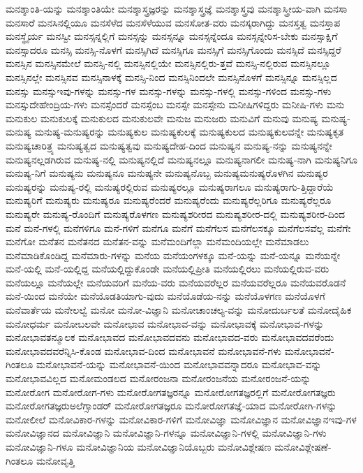 {ಮನಶ್ಶಾಂತಿ-ಯನ್ನು
ಮನಶ್ಶಾಂತಿಯೇ
ಮನಶ್ಶಾಸ್ತ್ರಜ್ಞರನ್ನು
ಮನಶ್ಶಾಸ್ತ್ರಜ್ಞೆ
ಮನಶ್ಶಾಸ್ತ್ರವು
ಮನಶ್ಶಾಸ್ತ್ರೀಯ-ವಾಗಿ
ಮನಸಾ
ಮನಸಾರೆ
ಮನಸಿನಲ್ಲಿಯೂ
ಮನಸೆಳೆದ
ಮನಸೆಳೆಯುವ
ಮನಸೋತ-ವರು
ಮನಸ್ಕರಾಗಿದ್ದು
ಮನಸ್ತತ್ವ
ಮನಸ್ತಾಪ
ಮನಸ್ಥೈರ್ಯ
ಮನಸ್ವೀ
ಮನಸ್ಸನ್ನಲ್ಲಿಗೆ
ಮನಸ್ಸನ್ನು
ಮನಸ್ಸನ್ನೂ
ಮನಸ್ಸನ್ನೆಂದೂ
ಮನಸ್ಸನ್ನೇರಿಸ-ಬೇಕು
ಮನಸ್ಸಾಕ್ಷಿಗೆ
ಮನಸ್ಸಾದರೂ
ಮನಸ್ಸಿ
ಮನಸ್ಸಿ-ನೊಳಗೆ
ಮನಸ್ಸಿಗಿದೆ
ಮನಸ್ಸಿಗೂ
ಮನಸ್ಸಿಗೆ
ಮನಸ್ಸಿಗೊಂದು
ಮನಸ್ಸಿದೆ
ಮನಸ್ಸಿದ್ದರೆ
ಮನಸ್ಸಿನ
ಮನಸ್ಸಿನಮೇಲೆ
ಮನಸ್ಸಿ-ನಲ್ಲಿ
ಮನಸ್ಸಿನಲ್ಲಿಯೇ
ಮನಸ್ಸಿನಲ್ಲಿರು-ತ್ತವೆ
ಮನಸ್ಸಿ-ನಲ್ಲಿರುವ
ಮನಸ್ಸಿನಲ್ಲೂ
ಮನಸ್ಸಿನಲ್ಲೇ
ಮನಸ್ಸಿನವ
ಮನಸ್ಸಿನಾಳಕ್ಕೆ
ಮನಸ್ಸಿ-ನಿಂದ
ಮನಸ್ಸಿನಿಂದಲೇ
ಮನಸ್ಸಿನೊಳಗೆ
ಮನಸ್ಸಿನ್ನೂ
ಮನಸ್ಸಿಲ್ಲದ
ಮನಸ್ಸು
ಮನಸ್ಸುಇವು-ಗಳನ್ನು
ಮನಸ್ಸು-ಗಳ
ಮನಸ್ಸು-ಗಳನ್ನು
ಮನಸ್ಸು-ಗಳಲ್ಲಿ
ಮನಸ್ಸು-ಗಳಿಂದ
ಮನಸ್ಸು-ಗಳು
ಮನಸ್ಸುದೇಹೇಂದ್ರಿಯ-ಗಳು
ಮನಸ್ಸೆಂದರೆ
ಮನಸ್ಸೆಂಬ
ಮನಸ್ಸೇ
ಮನಸ್ಸೇನು
ಮನೀಷಿಗಳಿದ್ದರು
ಮನೀಷಿ-ಗಳು
ಮನು
ಮನುಕುಲ
ಮನುಕುಲಕ್ಕೆ
ಮನುಕುಲದ
ಮನುಕುಲವೇ
ಮನುಜ
ಮನುಜರು
ಮನುವಿಗೆ
ಮನುವು
ಮನುಷ್ಯ
ಮನುಷ್ಯ-ಮನುಷ್ಯ
ಮನುಷ್ಯ-ಮನುಷ್ಯರನ್ನು
ಮನುಷ್ಯಕುಲ
ಮನುಷ್ಯಕುಲಕ್ಕೆ
ಮನುಷ್ಯಕುಲದ
ಮನುಷ್ಯಕುಲವನ್ನೇ
ಮನುಷ್ಯಕೃತ
ಮನುಷ್ಯಚಾರಿತ್ರ್ಯ
ಮನುಷ್ಯತ್ವದ
ಮನುಷ್ಯತ್ವವು
ಮನುಷ್ಯದೇಹ-ದಿಂದ
ಮನುಷ್ಯನ
ಮನುಷ್ಯ-ನನ್ನು
ಮನುಷ್ಯನನ್ನೇ
ಮನುಷ್ಯನಲ್ಲಡಗಿರುವ
ಮನುಷ್ಯ-ನಲ್ಲಿ
ಮನುಷ್ಯನಲ್ಲಿದೆ
ಮನುಷ್ಯನಲ್ಲೂ
ಮನುಷ್ಯನಾಗಲೀ
ಮನುಷ್ಯ-ನಾಗಿ
ಮನುಷ್ಯನಿಗೂ
ಮನುಷ್ಯ-ನಿಗೆ
ಮನುಷ್ಯನು
ಮನುಷ್ಯನೂ
ಮನುಷ್ಯನೇ
ಮನುಷ್ಯನೊಬ್ಬ
ಮನುಷ್ಯಮನುಷ್ಯರೊಳಗಿನ
ಮನುಷ್ಯರ
ಮನುಷ್ಯರನ್ನು
ಮನುಷ್ಯ-ರಲ್ಲಿ
ಮನುಷ್ಯರಲ್ಲಿರುವ
ಮನುಷ್ಯರಲ್ಲೂ
ಮನುಷ್ಯರಾಗಲೂ
ಮನುಷ್ಯರಾಗು-ತ್ತಿದ್ದಾರೆಯೆ
ಮನುಷ್ಯರಿಗೆ
ಮನುಷ್ಯರು
ಮನುಷ್ಯರೂ
ಮನುಷ್ಯರೆಂದರೆ
ಮನುಷ್ಯರೆಂದು
ಮನುಷ್ಯರೆಲ್ಲರಿಗೂ
ಮನುಷ್ಯರೆಲ್ಲರೂ
ಮನುಷ್ಯರೇ
ಮನುಷ್ಯ-ರೊಂದಿಗೆ
ಮನುಷ್ಯರೊಳಗಣ
ಮನುಷ್ಯಶರೀರದ
ಮನುಷ್ಯಶರೀರ-ದಲ್ಲಿ
ಮನುಷ್ಯಶರೀರ-ದಿಂದ
ಮನೆ
ಮನೆ-ಗಳಲ್ಲಿ
ಮನೆಗಳಿಗೂ
ಮನೆ-ಗಳಿಗೆ
ಮನೆಗೂ
ಮನೆಗೆ
ಮನೆಗೆಲಸ
ಮನೆಗೆಲಸಕ್ಕೂ
ಮನೆಗೆಲಸವೆಲ್ಲ
ಮನೆಗೇ
ಮನೆಗೋ
ಮನೆತನ
ಮನೆತನದ
ಮನೆತನ-ವನ್ನು
ಮನೆಮಂದಿಗೆಲ್ಲಾ
ಮನೆಮಂದಿಯಲ್ಲೇ
ಮನೆಮಾಡಲು
ಮನೆಮಾಡಿಕೊಂಡಿದ್ದ
ಮನೆಮಾರು-ಗಳನ್ನು
ಮನೆಯ
ಮನೆಯಂಗಳಕ್ಕೂ
ಮನೆ-ಯನ್ನು
ಮನೆ-ಯನ್ನೂ
ಮನೆಯನ್ನೇ
ಮನೆ-ಯಲ್ಲಿ
ಮನೆ-ಯಲ್ಲಿದ್ದ
ಮನೆಯಲ್ಲಿದ್ದುಕೊಂಡೇ
ಮನೆಯಲ್ಲಿಪ್ರೀತಿ
ಮನೆಯಲ್ಲಿರಲು
ಮನೆಯಲ್ಲಿರುವ-ವರು
ಮನೆಯಲ್ಲೂ
ಮನೆಯಲ್ಲೇ
ಮನೆಯವರಿಗೆ
ಮನೆಯ-ವರು
ಮನೆಯವರೆಲ್ಲರ
ಮನೆಯವರೆಲ್ಲರೂ
ಮನೆಯವರೊಡನೆ
ಮನೆ-ಯಿಂದ
ಮನೆಯೇ
ಮನೆಯೊಡತಿಯಾಗು-ವುದು
ಮನೆಯೊಡೆಯ-ನನ್ನು
ಮನೆಯೊಳಗಣ
ಮನೆಯೊಳಗೆ
ಮನೆವಾರ್ತೆಯ
ಮನೇಲಲ್ವೆ
ಮನೋ
ಮನೋ-ವಿಜ್ಞಾನಿ
ಮನೋಚಾಂಚಲ್ಯ-ವನ್ನು
ಮನೋದುರ್ಬಲತೆ
ಮನೋದೈಹಿಕ
ಮನೋಧರ್ಮ
ಮನೋಬಲವೇ
ಮನೋಭಾವ
ಮನೋಭಾವ-ವನ್ನು
ಮನೋಭಾವಕ್ಕೆ
ಮನೋಭಾವ-ಗಳನ್ನು
ಮನೋಭಾವತನ್ಮೂಲಕ
ಮನೋಭಾವದ
ಮನೋಭಾವದವನು
ಮನೋಭಾವದ-ವರು
ಮನೋಭಾವದವರೆಂದು
ಮನೋಭಾವದವರೆನ್ನಿಸಿ-ಕೊಂಡ
ಮನೋಭಾವ-ದಿಂದ
ಮನೋಭಾವನೆ
ಮನೋಭಾವನೆ-ಗಳು
ಮನೋಭಾವನೆ-ಗಿಂತಲೂ
ಮನೋಭಾವನೆ-ಯನ್ನು
ಮನೋಭಾವನೆ-ಯಿಂದ
ಮನೋಭಾವವನ್ನಾದರೂ
ಮನೋಭಾವ-ವನ್ನು
ಮನೋಭಾವವಿಲ್ಲದ
ಮನೋಮಂಡಲದ
ಮನೋರಂಜನಾ
ಮನೋರಂಜನೆಯ
ಮನೋರಂಜನೆ-ಯನ್ನು
ಮನೋರೋಗ
ಮನೋರೋಗ-ಗಳು
ಮನೋರೋಗತಜ್ಞರನ್ನೂ
ಮನೋರೋಗತಜ್ಞರಲ್ಲಿಗೆ
ಮನೋರೋಗತಜ್ಞರು
ಮನೋರೋಗತಜ್ಞರುಅಲೆಗ್ಸಾಂಡರ್
ಮನೋರೋಗತಜ್ಞರೂ
ಮನೋರೋಗತಜ್ಞೆ-ಯಾದ
ಮನೋರೋಗಿ-ಗಳನ್ನು
ಮನೋಲೀಲೆ
ಮನೋವಿಕಾರ-ಗಳನ್ನು
ಮನೋವಿಕಾರ-ಗಳಿಗೆ
ಮನೋವಿಜ್ಞಾ
ಮನೋವಿಜ್ಞಾನ
ಮನೋವಿಜ್ಞಾನಇವು-ಗಳ
ಮನೋವಿಜ್ಞಾನದ
ಮನೋವಿಜ್ಞಾನಿ
ಮನೋವಿಜ್ಞಾನಿ-ಗಳನ್ನೂ
ಮನೋವಿಜ್ಞಾನಿ-ಗಳಲ್ಲಿ
ಮನೋವಿಜ್ಞಾನಿ-ಗಳು
ಮನೋವಿಜ್ಞಾನಿ-ಗಳೂ
ಮನೋವಿಜ್ಞಾನಿಯ
ಮನೋವಿಜ್ಞಾನಿಯೊಬ್ಬರು
ಮನೋವಿಶ್ಲೇಷಣ
ಮನೋವಿಶ್ಲೇಷಣೆ-ಗಿಂತಲೂ
ಮನೋವೃತ್ತಿ
}
